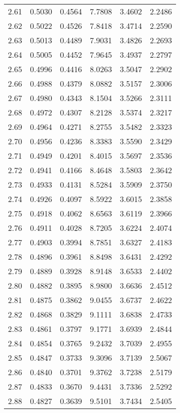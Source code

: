 \documentclass{article}
\begin{document}
\begin{longtable}{cccccc}
2.61 & 0.5030 & 0.4564 & 7.7808 & 3.4602 & 2.2486 \\
2.62 & 0.5022 & 0.4526 & 7.8418 & 3.4714 & 2.2590 \\
2.63 & 0.5013 & 0.4489 & 7.9031 & 3.4826 & 2.2693 \\
2.64 & 0.5005 & 0.4452 & 7.9645 & 3.4937 & 2.2797 \\
2.65 & 0.4996 & 0.4416 & 8.0263 & 3.5047 & 2.2902 \\
2.66 & 0.4988 & 0.4379 & 8.0882 & 3.5157 & 2.3006 \\
2.67 & 0.4980 & 0.4343 & 8.1504 & 3.5266 & 2.3111 \\
2.68 & 0.4972 & 0.4307 & 8.2128 & 3.5374 & 2.3217 \\
2.69 & 0.4964 & 0.4271 & 8.2755 & 3.5482 & 2.3323 \\
2.70 & 0.4956 & 0.4236 & 8.3383 & 3.5590 & 2.3429 \\
2.71 & 0.4949 & 0.4201 & 8.4015 & 3.5697 & 2.3536 \\
2.72 & 0.4941 & 0.4166 & 8.4648 & 3.5803 & 2.3642 \\
2.73 & 0.4933 & 0.4131 & 8.5284 & 3.5909 & 2.3750 \\
2.74 & 0.4926 & 0.4097 & 8.5922 & 3.6015 & 2.3858 \\
2.75 & 0.4918 & 0.4062 & 8.6563 & 3.6119 & 2.3966 \\
2.76 & 0.4911 & 0.4028 & 8.7205 & 3.6224 & 2.4074 \\
2.77 & 0.4903 & 0.3994 & 8.7851 & 3.6327 & 2.4183 \\
2.78 & 0.4896 & 0.3961 & 8.8498 & 3.6431 & 2.4292 \\
2.79 & 0.4889 & 0.3928 & 8.9148 & 3.6533 & 2.4402 \\
2.80 & 0.4882 & 0.3895 & 8.9800 & 3.6636 & 2.4512 \\
2.81 & 0.4875 & 0.3862 & 9.0455 & 3.6737 & 2.4622 \\
2.82 & 0.4868 & 0.3829 & 9.1111 & 3.6838 & 2.4733 \\
2.83 & 0.4861 & 0.3797 & 9.1771 & 3.6939 & 2.4844 \\
2.84 & 0.4854 & 0.3765 & 9.2432 & 3.7039 & 2.4955 \\
2.85 & 0.4847 & 0.3733 & 9.3096 & 3.7139 & 2.5067 \\
2.86 & 0.4840 & 0.3701 & 9.3762 & 3.7238 & 2.5179 \\
2.87 & 0.4833 & 0.3670 & 9.4431 & 3.7336 & 2.5292 \\
2.88 & 0.4827 & 0.3639 & 9.5101 & 3.7434 & 2.5405 \\

\end{longtable}
\end{document}

